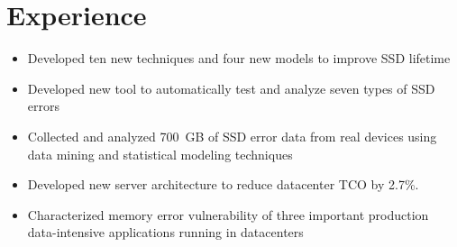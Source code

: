 \documentclass[]{resume}
\begin{document}
\hfill
\begin{minipage}[t]{0.613\textwidth}


\section{Experience}
\begin{itemize}[topsep=0pt,partopsep=0pt,noitemsep,leftmargin=10pt]
\item Developed ten new techniques and four new models to improve SSD lifetime
\item Developed new tool to automatically test and analyze seven types of SSD errors
\item Collected and analyzed 700~GB of SSD error data from real devices using data mining and statistical modeling techniques
\end{itemize}
\sectionsep%

\begin{itemize}[topsep=0pt,partopsep=0pt,noitemsep,leftmargin=10pt]
\item Developed new server architecture to reduce datacenter TCO by 2.7\%.
\item Characterized memory error vulnerability of three important production data-intensive applications running in datacenters
\end{itemize}




\end{minipage}
\end{document}
